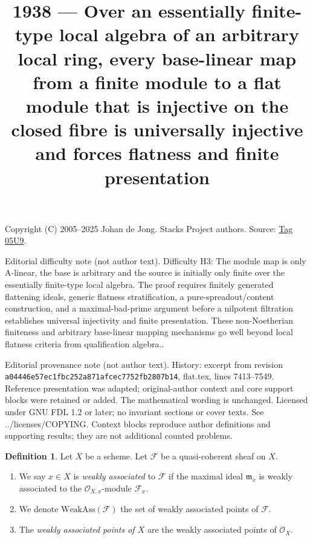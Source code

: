 \documentclass{amsart}
\theoremstyle{plain}
\theoremstyle{definition}
\newtheorem{definition}[subsection]{Definition}
\theoremstyle{remark}
\numberwithin{equation}{subsection}
\begin{document}
\title[Stacks Project, Tag 05U9]{1938 --- Over an essentially finite-type local algebra of an arbitrary local ring, every base-linear map from a finite module to a flat module that is injective on the closed fibre is universally injective and forces flatness and finite presentation}
\maketitle
\noindent Copyright (C) 2005--2025 Johan de Jong. Stacks Project authors. Source: \href{https://stacks.math.columbia.edu/tag/05U9}{Tag 05U9}.

\noindent Editorial difficulty note (not author text). Difficulty H3: The module map is only A-linear, the base is arbitrary and the source is initially only finite over the essentially finite-type local algebra. The proof requires finitely generated flattening ideals, generic flatness stratification, a pure-spreadout/content construction, and a maximal-bad-prime argument before a nilpotent filtration establishes universal injectivity and finite presentation. These non-Noetherian finiteness and arbitrary base-linear mapping mechanisms go well beyond local flatness criteria from qualification algebra..

\noindent Editorial provenance note (not author text). History: excerpt from revision \texttt{a0444\allowbreak 6e57e\allowbreak c1fbc\allowbreak 252a8\allowbreak 71afc\allowbreak ec775\allowbreak 2fb28\allowbreak 07b14}, flat.tex, lines 7413--7549. Reference presentation was adapted; original-author context and core support blocks were retained or added. The mathematical wording is unchanged. Licensed under GNU FDL 1.2 or later; no invariant sections or cover texts. See ../licenses/COPYING. Context blocks reproduce author definitions and supporting results; they are not additional counted problems.

\begin{definition}
\label{divisors-definition-weakly-associated}
Let $X$ be a scheme.
Let $\mathcal{F}$ be a quasi-coherent sheaf on $X$.
\begin{enumerate}
\item We say $x \in X$ is {\it weakly associated} to $\mathcal{F}$
if the maximal ideal $\mathfrak m_x$ is weakly associated to the
$\mathcal{O}_{X, x}$-module $\mathcal{F}_x$.
\item We denote $\text{WeakAss}(\mathcal{F})$ the set of weakly associated
points of $\mathcal{F}$.
\item The {\it weakly associated points of $X$} are the weakly associated
points of $\mathcal{O}_X$.
\end{enumerate}
\end{definition}
\end{document}
